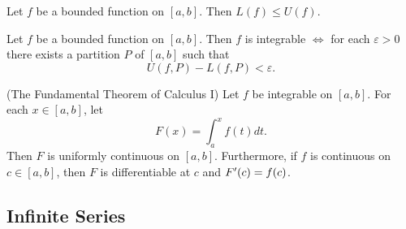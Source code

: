 \documentclass[12pt]{article}
\begin{document}
\begin{theorem}
  Let $f$ be a bounded function on $[a,b]$. Then $L(f) \le U(f)$.
\end{theorem}

\begin{theorem}
  Let $f$ be a bounded function on $[a,b]$. Then $f$ is integrable $\iff$ for
  each $\varepsilon > 0$ there exists a partition $P$ of $[a,b]$ such that $$U(f, P) -
  L(f, P) < \varepsilon.$$
\end{theorem}

\begin{theorem}
(The Fundamental Theorem of Calculus I) Let $f$ be integrable on $[a,b]$. For
each $x \in [a,b]$, let $$F(x) = \int_a^x f(t) dt.$$ Then $F$ is uniformly
continuous on $[a,b]$. Furthermore, if $f$ is continuous on $c \in [a,b]$, then
$F$ is differentiable at $c$ and $F'(c) = f(c)$.
\end{theorem}

\subsection{Infinite Series}
\label{sec:org4977e5c}
\end{document}
